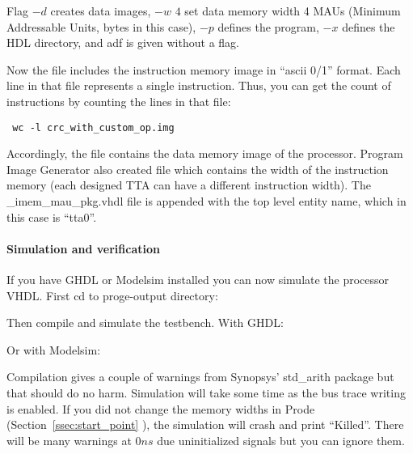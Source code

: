 \documentclass[twoside]{tceusermanual}
\begin{document}
Flag $-d$ creates data images, $-w$ $4$ set data memory width 4 MAUs
(Minimum Addressable Units, bytes in this case), $-p$ defines the
program, $-x$ defines the HDL directory, and adf is given without a
flag.

Now the file  includes the instruction memory
image in ``ascii 0/1'' format. Each line in that file represents a single
instruction. Thus, you can get the count of instructions by counting the
lines in that file:

\begin{verbatim}
 wc -l crc_with_custom_op.img
\end{verbatim}


Accordingly, the file  contains the data
memory image of the processor. Program Image Generator also created file
 which contains the 
width of the instruction memory (each designed TTA can have a different 
instruction width). The \_imem\_mau\_pkg.vhdl file is appended with the top
level entity name, which in this case is ``tta0''.

\paragraph{Simulation and verification}

If you have GHDL or Modelsim installed you can now simulate the processor VHDL.
First cd to proge-output directory:


Then compile and simulate the testbench. With GHDL:



Or with Modelsim:



Compilation gives a couple of warnings from Synopsys' std\_arith
package but that should do no harm.  Simulation will take some time as
the bus trace writing is enabled. If you did not change the memory
widths in Prode (Section~\ref{ssec:start_point} ), the simulation will crash and print
``Killed''. There will be many warnings at $0 ns$ due uninitialized
signals but you can ignore them. 
\end{document}
